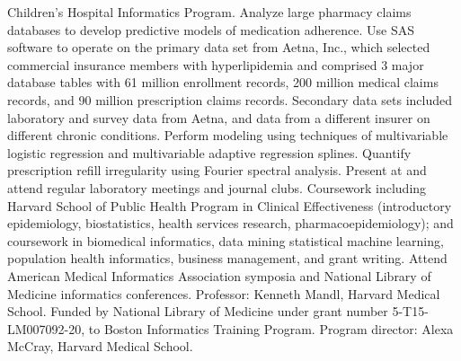 \documentclass[12pt]{article}
\begin{document}
Children’s Hospital Informatics Program. Analyze large pharmacy claims
databases to develop predictive models of medication adherence. Use
SAS software to operate on the primary data set from Aetna, Inc.,
which selected commercial insurance members with hyperlipidemia and
comprised 3 major database tables with 61 million enrollment records,
200 million medical claims records, and 90 million prescription claims
records. Secondary data sets included laboratory and survey data from
Aetna, and data from a different insurer on different chronic
conditions. Perform modeling using techniques of multivariable
logistic regression and multivariable adaptive regression splines.
Quantify prescription refill irregularity using Fourier spectral
analysis. Present at and attend regular laboratory meetings and
journal clubs. Coursework including Harvard School of Public Health
Program in Clinical Effectiveness (introductory epidemiology,
biostatistics, health services research, pharmacoepidemiology); and
coursework in biomedical informatics, data mining statistical machine
learning, population health informatics, business management, and
grant writing. Attend American Medical Informatics Association
symposia and National Library of Medicine informatics conferences.
Professor: Kenneth Mandl, Harvard Medical School. Funded by National
Library of Medicine under grant number 5-T15-LM007092-20, to Boston
Informatics Training Program. Program director: Alexa McCray, Harvard
Medical School.
\end{document}
